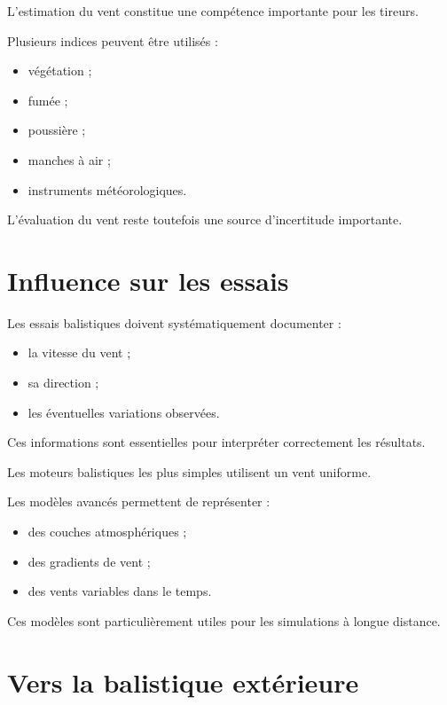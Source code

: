 L'estimation du vent constitue une compétence importante pour les tireurs.

Plusieurs indices peuvent être utilisés :

\begin{itemize}
\item végétation ;
\item fumée ;
\item poussière ;
\item manches à air ;
\item instruments météorologiques.
\end{itemize}

L'évaluation du vent reste toutefois une source d'incertitude importante.

\section{Influence sur les essais}

Les essais balistiques doivent systématiquement documenter :

\begin{itemize}
\item la vitesse du vent ;
\item sa direction ;
\item les éventuelles variations observées.
\end{itemize}

Ces informations sont essentielles pour interpréter correctement les
résultats.

\begin{simulation}

Les moteurs balistiques les plus simples utilisent un vent uniforme.

Les modèles avancés permettent de représenter :

\begin{itemize}
\item des couches atmosphériques ;
\item des gradients de vent ;
\item des vents variables dans le temps.
\end{itemize}

Ces modèles sont particulièrement utiles pour les simulations à longue
distance.

\end{simulation}

\section{Vers la balistique extérieure}

